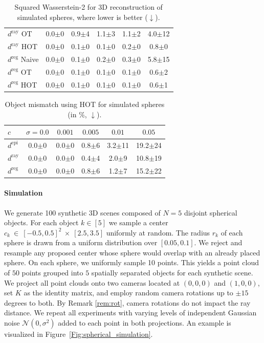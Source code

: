 \documentclass[10pt, twocolumn]{article}
\theoremstyle{definition}
\begin{document}
\begin{table}[t]
\begin{minipage}{0.48\linewidth}
\begin{tabular}{lccccc}
$d^{\text{ray}}$ OT & 0.0$\pm$0 & 0.9$\pm$4 & 1.1$\pm$3 & 1.1$\pm$2 & 4.0$\pm$12 \\
$d^{\text{ray}}$ HOT & 0.0$\pm$0 & 0.1$\pm$0 & 0.1$\pm$0 & 0.2$\pm$0 & 0.8$\pm$0 \\
\midrule
$d^{\text{reg}}$ Naive & 0.0$\pm$0 & 0.1$\pm$0 & 0.2$\pm$0 & 0.3$\pm$0 & 5.8$\pm$15 \\
$d^{\text{reg}}$ OT & 0.0$\pm$0 & 0.1$\pm$0 & 0.1$\pm$0 & 0.1$\pm$0 & 0.6$\pm$2 \\
$d^{\text{reg}}$ HOT & 0.0$\pm$0 & 0.1$\pm$0 & 0.1$\pm$0 & 0.1$\pm$0 & 0.6$\pm$1 \\
\bottomrule
\end{tabular}
\caption{Squared Wasserstein-2 for 3D reconstruction of simulated spheres, where lower is better ($\downarrow$).}
\label{tab:syn_point_wasserstein}
\end{minipage}
\end{table}


\begin{table}[t]
\scriptsize
\centering
\setlength{\tabcolsep}{5pt}
\begin{tabular}{lccccc}
\toprule
$c$ & $\sigma=0.0$ & $0.001$ & $0.005$ & $0.01$ & $0.05$ \\
\midrule
$d^{\text{epi}}$ & 0.0$\pm$0 & 0.0$\pm$0 & 0.8$\pm$6 & 3.2$\pm$11 & 19.2$\pm$24 \\
\midrule
$d^{\text{ray}}$ & 0.0$\pm$0 & 0.0$\pm$0 & 0.4$\pm$4 & 2.0$\pm$9 & 10.8$\pm$19 \\
\midrule
$d^{\text{reg}}$ & 0.0$\pm$0 & 0.0$\pm$0 & 0.8$\pm$6 & 1.2$\pm$7 & 15.2$\pm$22 \\
\bottomrule
\end{tabular}
\caption{Object mismatch using HOT for simulated spheres (in \%, $\downarrow$).}
\label{tab:syn_object_mismatch}
\end{table}


\paragraph*{Simulation}
We generate 100 synthetic 3D scenes composed of $N = 5$ disjoint spherical objects. 
For each object $k \in [5]$ we sample a center 
$c_k~\in~[-0.5,0.5]^2~\times~[2.5, 3.5]$ uniformly at random. The radius $r_k$ of each sphere is drawn from a uniform distribution over $[0.05,0.1]$. We reject and resample any proposed center whose sphere would overlap 
with an already placed sphere. 
On each sphere, we uniformly sample 10 points. 
This yields a point cloud of $50$ points grouped into $5$ spatially separated objects for each synthetic scene.
We project all point clouds onto two cameras located at $(0, 0, 0)$ and $(1, 0, 0)$, set $K$ as the identity matrix, and employ random camera rotations up to $\pm 15$ degrees to both. By Remark \ref{rem:rot}, camera rotations do not impact the ray distance.
We repeat all experiments with varying levels of independent Gaussian noise $\mathcal{N}(0, \sigma^2)$ added to each point in both projections. An example is visualized in Figure~\ref{Fig:spherical_simulation}.
\end{document}
